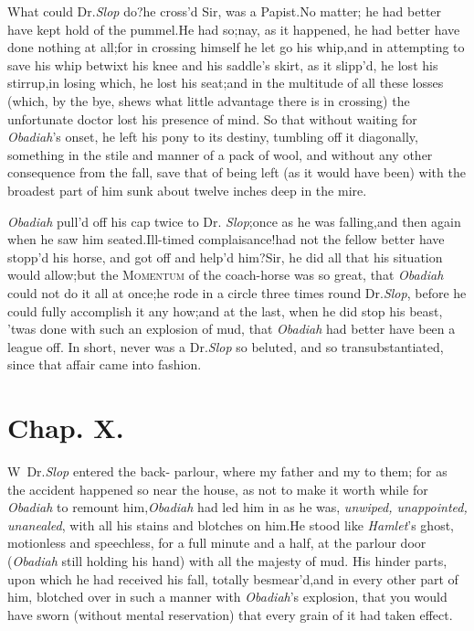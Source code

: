 \documentclass{article}
\begin{document}
\newpage
What could Dr.\@ \textit{Slop} do?\tsh he cross’d
Sir, was a Papist.\tsk No matter; he had better have kept
hold of the pummel.\break He had so;\tsk nay, as it
happened, he had better have done nothing at all;\tsk for in
crossing himself he let go his whip,\tsk\break and in
attempting to save his whip betwixt his knee and his
saddle’s skirt, as it slipp’d, he lost his stirrup,\tsk in
losing which, he lost his seat;\tsk and in the multitude of
all these losses (which, by the bye, shews what little
advantage there is in crossing) the unfortunate doctor lost
his presence of mind. So that without waiting for
\textit{Obadiah}’s onset, he left his pony to its destiny,
tumbling off it diagonally, something in the stile and
manner of a pack of wool, and without any other consequence
from the fall, save that of being left (as it would have
been)\pb
with the broadest part of him sunk about twelve inches deep in the mire.

\textit{Obadiah} pull’d off his cap twice to Dr.\@
\textit{Slop};\tsh once as he was falling,\tsk and then again
when he saw him seated.\tsk Ill-timed
complaisance!\tsh had not the fellow better have stopp’d his
horse, and got off and help’d him?\tsk Sir, he did all that
his situation would allow;\tsk but the\break
\textsc{Momentum} of the coach-horse was so great, that \textit{Obadiah} could not do it
all at once;\tsh he rode in a circle three times round Dr.\@ \textit{Slop},
before he could fully accomplish it any how;\tsk and at the last, when
he did stop his beast, ’twas done with such an explosion of
mud, that \textit{Obadiah} had better have been a league
off.\break
In short, never was a Dr.\@ \textit{Slop} so beluted, and so
transubstantiated, since that affair\break
came into fashion.

\newpage
\section{Chap. X.}

\lettrine{W}{\,} Dr.\@ \textit{Slop} entered the back-\break
parlour, where my father and my\break
{}\break
{}
to them; for as the accident happened so near the house, as not to make it worth while for
\textit{Obadiah} to remount him,\tsk\break \textit{Obadiah} had led
him in as he was, \textit{un\-wiped, unappointed, unanealed}, with all
his stains and blotches on him.\tsk He stood like
\textit{Hamlet}’s ghost, motionless and speechless, for a full
minute and a half, at the parlour door (\textit{Obadiah} still holding
his hand) with all the majesty of mud. His hinder parts, upon which he had
received his fall, totally besmear’d,\tsh and\pb
in every other part of him, blotched over in such a manner with
\textit{Obadiah}’s explosion, that you would have sworn
(without mental reservation) that every grain of it had taken
effect.
\end{document}
